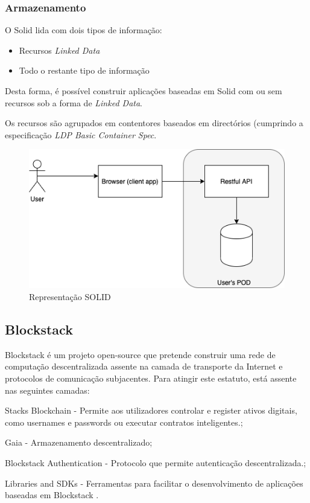 \subsubsection{Armazenamento}
O Solid lida com dois tipos de informação:
\begin{itemize}
    \item Recursos \emph{Linked Data}
    \item Todo o restante tipo de informação
\end{itemize}
Desta forma, é possível construir aplicações baseadas em Solid com ou sem recursos sob a forma de \emph{Linked Data}.\cite{solid_spec}

Os recursos são agrupados em contentores baseados em directórios (cumprindo a especificação \emph{LDP Basic Container Spec}.\cite{solid_spec}

\begin{figure}[h]
    \begin{center}
    \includegraphics[width=1\textwidth]{figures/estado_arte-Solid.png}
    \caption{Representação SOLID}
    \end{center}
\end{figure}

\pagebreak

\subsection{Blockstack}
Blockstack é um projeto open-source que pretende construir uma rede de computação descentralizada assente na camada de transporte da Internet e protocolos de comunicação subjacentes. Para atingir este estatuto, está assente nas seguintes camadas:
\begin{description}
	\item Stacks Blockchain - Permite aos utilizadores controlar e register ativos digitais, como usernames e passwords ou executar contratos inteligentes.\cite{blockstack_white_paper};
	\item Gaia - Armazenamento descentralizado;
	\item Blockstack Authentication - Protocolo que permite autenticação descentralizada.\cite{blockstack_white_paper};
	\item Libraries and SDKs - Ferramentas para facilitar o desenvolvimento de aplicações baseadas em Blockstack \cite{blockstack_white_paper}.
\end{description}

